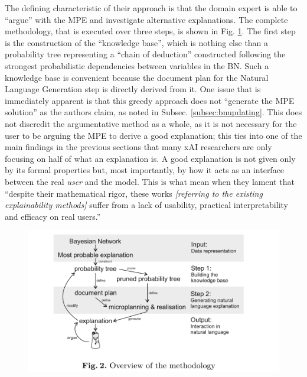 The defining characteristic of their approach is that the domain expert is able to \enquote{argue} with the MPE and investigate alternative explanations.
The complete methodology, that is executed over three steps, is shown in Fig. \ref{fig:butz-methodology}.
The first step is the construction of the \enquote{knowledge base}, which is nothing else than a probability tree representing a \enquote{chain of deduction} constructed following the strongest probabilistic dependencies between variables in the BN.
Such a knowledge base is convenient because the document plan for the Natural Language Generation step is directly derived from it.
One issue that is immediately apparent is that this greedy approach does not \enquote{generate the MPE solution} as the authors claim, as noted in Subsec. \ref{subsec:bnupdating}.
This does not discredit the argumentative method as a whole, as it is not necessary for the user to be arguing the MPE to derive a good explanation; this ties into one of the main findings in the previous sections that many xAI researchers are only focusing on half of what an explanation is.
A good explanation is not given only by its formal properties but, most importantly, by how it acts as an interface between the real \textit{user} and the model.
This is what \cite{abdul2018trends} mean when they lament that \enquote{despite their mathematical rigor, these works \textit{[referring to the existing explainability methods]} suffer from a lack of usability, practical interpretability and efficacy on real users.}

\begin{figure}[htbp]
\centerline{\includegraphics[width=\columnwidth]{literature-review/images/butz-methodology}}
\caption{\cite{Butz2018}}
\label{fig:butz-methodology}
\end{figure}

